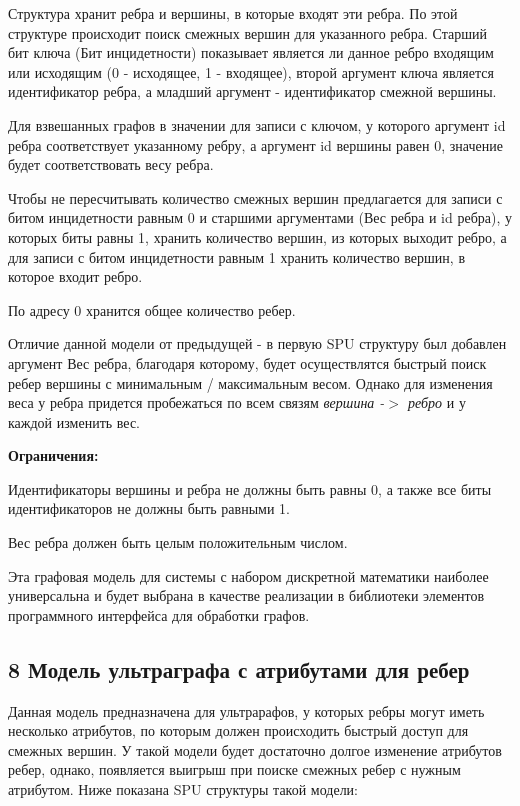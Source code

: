 \begin{DoxyEnumerate}
Структура хранит ребра и вершины, в которые входят эти ребра. По этой структуре происходит поиск смежных вершин для указанного ребра. Старший бит ключа ({\ttfamily Бит инцидетности}) показывает является ли данное ребро входящим или исходящим (0 -\/ исходящее, 1 -\/ входящее), второй аргумент ключа является идентификатор ребра, а младший аргумент -\/ идентификатор смежной вершины.

Для взвешанных графов в значении для записи с ключом, у которого аргумент {\ttfamily id ребра} соответствует указанному ребру, а аргумент {\ttfamily id вершины} равен 0, значение будет соответствовать весу ребра.

Чтобы не пересчитывать количество смежных вершин предлагается для записи с битом инцидетности равным 0 и старшими аргументами ({\ttfamily Вес ребра} и {\ttfamily id ребра}), у которых биты равны 1, хранить количество вершин, из которых выходит ребро, а для записи с битом инцидетности равным 1 хранить количество вершин, в которое входит ребро.

По адресу 0 хранится общее количество ребер.
\end{DoxyEnumerate}

Отличие данной модели от предыдущей -\/ в первую S\+PU структуру был добавлен аргумент {\ttfamily Вес ребра}, благодаря которому, будет осуществлятся быстрый поиск ребер вершины с минимальным / максимальным весом. Однако для изменения веса у ребра придется пробежаться по всем связям {\itshape вершина -\/$>$ ребро} и у каждой изменить вес.

{\bfseries Ограничения\+:}
\begin{DoxyEnumerate}
\item Идентификаторы вершины и ребра не должны быть равны 0, а также все биты идентификаторов не должны быть равными 1.
\item Вес ребра должен быть целым положительным числом.
\end{DoxyEnumerate}

Эта графовая модель для системы с набором дискретной математики наиболее универсальна и будет выбрана в качестве реализации в библиотеки элементов программного интерфейса для обработки графов.\hypertarget{md_docs__xD0_x93_xD1_x80_xD0_xB0_xD1_x84_xD0_xBE_xD0_xB2_xD1_x8B_xD0_xB5__xD0_xBC_xD0_xBE_xD0_xB4_xD0_xB5_xD0_xBB_xD0_xB8_autotoc_md11}{}\subsection{8 Модель ультраграфа с атрибутами для ребер}\label{md_docs__xD0_x93_xD1_x80_xD0_xB0_xD1_x84_xD0_xBE_xD0_xB2_xD1_x8B_xD0_xB5__xD0_xBC_xD0_xBE_xD0_xB4_xD0_xB5_xD0_xBB_xD0_xB8_autotoc_md11}
Данная модель предназначена для ультрарафов, у которых ребры могут иметь несколько атрибутов, по которым должен происходить быстрый доступ для смежных вершин. У такой модели будет достаточно долгое изменение атрибутов ребер, однако, появляется выигрыш при поиске смежных ребер с нужным атрибутом. Ниже показана S\+PU структуры такой модели\+:


